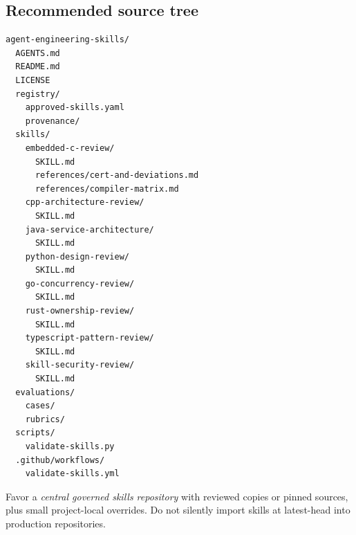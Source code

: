 \documentclass[11pt,letterpaper]{article}
\begin{document}
\subsection{Recommended source tree}
\begin{verbatim}
agent-engineering-skills/
  AGENTS.md
  README.md
  LICENSE
  registry/
    approved-skills.yaml
    provenance/
  skills/
    embedded-c-review/
      SKILL.md
      references/cert-and-deviations.md
      references/compiler-matrix.md
    cpp-architecture-review/
      SKILL.md
    java-service-architecture/
      SKILL.md
    python-design-review/
      SKILL.md
    go-concurrency-review/
      SKILL.md
    rust-ownership-review/
      SKILL.md
    typescript-pattern-review/
      SKILL.md
    skill-security-review/
      SKILL.md
  evaluations/
    cases/
    rubrics/
  scripts/
    validate-skills.py
  .github/workflows/
    validate-skills.yml
\end{verbatim}
Favor a \emph{central governed skills repository} with reviewed copies or pinned sources, plus small project-local overrides. Do not silently import skills at latest-head into production repositories.
\end{document}
